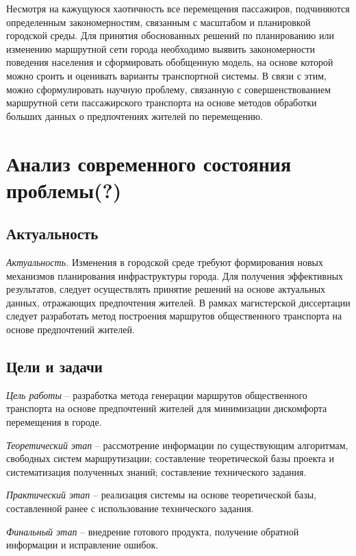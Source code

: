Несмотря на кажущуюся хаотичность все перемещения пассажиров, подчиняются определенным закономерностям, 
связанным с масштабом и планировкой городской среды. Для принятия обоснованных решений по планированию или 
изменению маршрутной сети города необходимо выявить закономерности поведения населения и сформировать 
обобщенную модель, на основе которой можно сроить и оценивать варианты транспортной системы. В связи с этим, 
можно сформулировать научную проблему, связанную с совершенствованием маршрутной сети пассажирского 
транспорта  на основе методов обработки больших данных о предпочтениях жителей по перемещению. 

\chapter{Анализ современного состояния проблемы(?)}
\section{Актуальность}
\emph{Актуальность.} Изменения в городской среде требуют формирования новых механизмов 
планирования инфраструктуры города. Для получения эффективных результатов, следует осуществлять 
принятие решений на основе актуальных данных, отражающих предпочтения жителей. В рамках 
магистерской диссертации следует разработать метод построения маршрутов общественного транспорта 
на основе предпочтений жителей.

\section{Цели и задачи}

\emph{Цель работы} -- разработка метода генерации маршрутов общественного транспорта на основе 
предпочтений жителей для минимизации дискомфорта перемещения в городе.

\emph{Теоретический этап} -- рассмотрение информации по существующим алгоритмам, свободных систем 
маршрутизации; составление теоретической базы проекта и систематизация полученных знаний; 
составление технического задания. 

\emph{Практический этап} -- реализация системы на основе теоретической базы, составленной ранее с 
использование технического задания.

\emph{Финальный этап} -- внедрение готового продукта, получение обратной информации и исправление 
ошибок.

